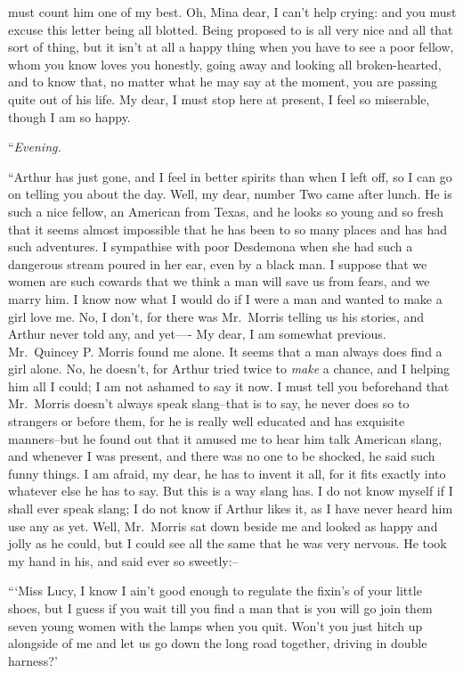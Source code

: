 \documentclass[12pt,openright]{book}
\begin{document}
must count him one of my best. Oh, Mina dear, I can’t help crying: and you must excuse this letter being all blotted. Being proposed to is all very nice and all that sort of thing, but it isn’t at all a happy thing when you have to see a poor fellow, whom you know loves you honestly, going away and looking all broken-hearted, and to know that, no matter what he may say at the moment, you are passing quite out of his life. My dear, I must stop here at present, I feel so miserable, though I am so happy.

“\textit{Evening.}

“Arthur has just gone, and I feel in better spirits than when I left off, so I can go on telling you about the day. Well, my dear, number Two came after lunch. He is such a nice fellow, an American from Texas, and he looks so young and so fresh that it seems almost impossible that he has been to so many places and has had such adventures. I sympathise with poor Desdemona when she had such a dangerous stream poured in her ear, even by a black man. I suppose that we women are such cowards that we think a man will save us from fears, and we marry him. I know now what I would do if I were a man and wanted to make a girl love me. No, I don’t, for there was Mr. Morris telling us his stories, and Arthur never told any, and yet—- My dear, I am somewhat previous. Mr. Quincey P. Morris found me alone. It seems that a man always does find a girl alone. No, he doesn’t, for Arthur tried twice to \textit{make} a chance, and I helping him all I could; I am not ashamed to say it now. I must tell you beforehand that Mr. Morris doesn’t always speak slang–that is to say, he never does so to strangers or before them, for he is really well educated and has exquisite manners–but he found out that it amused me to hear him talk American slang, and whenever I was present, and there was no one to be shocked, he said such funny things. I am afraid, my dear, he has to invent it all, for it fits exactly into whatever else he has to say. But this is a way slang has. I do not know myself if I shall ever speak slang; I do not know if Arthur likes it, as I have never heard him use any as yet. Well, Mr. Morris sat down beside me and looked as happy and jolly as he could, but I could see all the same that he was very nervous. He took my hand in his, and said ever so sweetly:–

“‘Miss Lucy, I know I ain’t good enough to regulate the fixin’s of your little shoes, but I guess if you wait till you find a man that is you will go join them seven young women with the lamps when you quit. Won’t you just hitch up alongside of me and let us go down the long road together, driving in double harness?’
\end{document}
